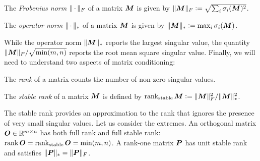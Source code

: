 \begin{definition} The \textit{Frobenius norm} $\Vert {\,\cdot\,} \Vert_F$ of a matrix ${\bm{M}}$ is given by $\Vert {{\bm{M}}} \Vert_F \vcentcolon= \sqrt{\sum_{i} \sigma_i({\bm{M}})^2}$.
\end{definition}
\begin{definition} The \textit{operator norm} $\Vert {\,\cdot\,} \Vert_*$ of a matrix ${\bm{M}}$ is given by $\Vert {{\bm{M}}} \Vert_* \vcentcolon= \max_i \sigma_i({\bm{M}})$.
\end{definition}
While the operator norm $\Vert {{\bm{M}}} \Vert_*$ reports the largest singular value, the quantity $\Vert {{\bm{M}}} \Vert_F / \sqrt{\min(m,n)}$ reports the root mean square singular value. Finally, we will need to understand two aspects of matrix conditioning:
\begin{definition}[Rank] The \textit{rank} of a matrix counts the number of non-zero singular values.
\end{definition}
\begin{definition}
The \textit{stable rank} of a matrix ${\bm{M}}$ is defined by $\operatorname{rank_{stable}} {\bm{M}} \vcentcolon= \Vert {{\bm{M}}} \Vert_F^2 / \Vert {{\bm{M}}} \Vert_*^2$.
\end{definition}
The stable rank provides an approximation to the rank that ignores the presence of very small singular values. Let us consider the extremes. An orthogonal matrix ${\bm{O}}\in\mathbb{R}^{m\times n}$ has both full rank and full stable rank: $\operatorname{rank} {\bm{O}} = \operatorname{rank_{stable}} {\bm{O}} = \min(m,n)$. A rank-one matrix ${\bm{P}}$ has unit stable rank and satisfies $\Vert {{\bm{P}}} \Vert_* = \Vert {{\bm{P}}} \Vert_F$.